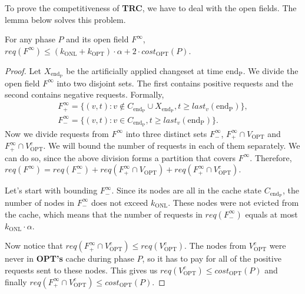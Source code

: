 
To prove the competitiveness of \textbf{TRC}, we have to deal with the open
fields. The lemma below solves this problem.
\begin{lemma} For any phase $P$ and
its open field $F^{\infty}$, $req(F^{\infty}) \leq (k_{\mathrm{ONL}} +
k_{\mathrm{OPT}}) \cdot \alpha + 2 \cdot cost_{\mathrm{OPT}}(P)$.
\label{thm:inifinite_filed_bound}
\end{lemma}
\begin{proof} Let
$X_{\mathrm{end_P}}$ be the artificially applied changeset at time
$\mathrm{end_P}$. We divide the open field $F^{\infty}$ into two disjoint sets.
The first contains positive requests and the second contains negative requests. Formally, 
\begin{gather*} F^{\infty}_{+} = \{(v, t): v \notin C_{\mathrm{end_P}} \cup
X_{\mathrm{end_P}}, t \geq last_v(\mathrm{end_P})\}, \\ F^{\infty}_{-} = \{(v,
t): v \in C_{\mathrm{end_P}}, t \geq last_v(\mathrm{end_P})\}.  \end{gather*}
Now we divide requests from $F^{\infty}$ into three distinct sets
$F^{\infty}_{-}$, $F^{\infty}_{+} \cap V_{\mathrm{OPT}}$ and $F^{\infty}_{+}
\cap V_{\mathrm{OPT}}^c$. We will bound the number of requests in each of them
separately. We can do so, since the above division forms a partition that covers
$F^{\infty}$. Therefore, $req(F^{\infty}) = req(F^{\infty}_{-}) +
req(F^{\infty}_{+} \cap V_{\mathrm{OPT}}) + req(F^{\infty}_{+} \cap
V_{\mathrm{OPT}}^c)$.

Let's start with bounding $F^{\infty}_{-}$. Since its nodes are all in the cache
state $C_{\mathrm{end_P}}$, the number of nodes in $F^{\infty}_{-}$ does not
exceed $k_{\mathrm{ONL}}$. These nodes were not evicted from the cache, which
means that the number of requests in $req(F^{\infty}_{-})$ equals at most
$k_{\mathrm{ONL}} \cdot \alpha$.

Now notice that $req(F^{\infty}_{+} \cap V_{\mathrm{OPT}}^c) \leq
req(V_{\mathrm{OPT}}^c)$. The nodes from $V_{\mathrm{OPT}}^c$ were never in
\textbf{OPT's} cache during phase $P$, so it has to pay for all of the positive
requests sent to these nodes. This gives us $req(V_{\mathrm{OPT}}^c) \leq
cost_{\mathrm{OPT}}(P)$ and finally $req(F^{\infty}_{+} \cap V_{\mathrm{OPT}}^c)
\leq cost_{\mathrm{OPT}}(P)$.


\end{proof}
